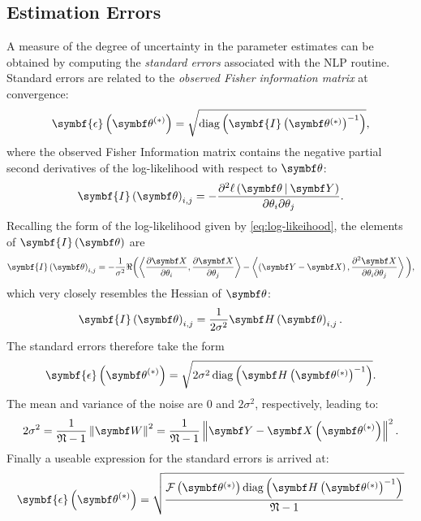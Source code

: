 \subsection{Estimation Errors}
\label{subsec:errors}
A measure of the degree of uncertainty in the parameter estimates can be obtained
by computing the \emph{standard errors} associated with the \ac{NLP} routine.
Standard errors are related  to the \emph{observed Fisher information matrix}
at convergence\cite[Section 2.7]{Pawitan2001}:
\begin{equation}
    \symbf{\epsilon}\left(\bthstar\right) = \sqrt{\diag\left(\symbf{I}\left( \bthstar \right)^{-1}\right)},
\end{equation}
where the observed Fisher Information matrix contains the negative partial second
derivatives of the log-likelihood with respect to $\bth$:
\begin{equation}
    \symbf{I}\left(\bth\right)_{i, j} =
        -\frac
        {\partial^2 \ell \left( \bdthY \right)}
        {\partial \theta_i \partial \theta_j}.
\end{equation}
Recalling the form of the log-likelihood given by \cref{eq:log-likeihood},
the elements of $\symbf{I}\left(\bth\right)$ are
\begin{equation}
    \symbf{I}\left(\bth\right)_{i, j} =
        -\frac{1}{\sigma^2}
        \Re
        \biggl(
            \left\langle
                \frac{\partial \bX}{\partial \theta_i},
                \frac{\partial \bX}{\partial \theta_j}
            \right\rangle
            -
            \left\langle
                \left(\bY - \bX\right),
                \frac{\partial^2 \bX}{\partial \theta_i \partial \theta_j}
            \right\rangle
        \biggl),
\end{equation}
which very closely resembles the Hessian of $\bth$:
\begin{equation}
    \symbf{I}\left(\bth\right)_{i,j} =
        \frac{1}{2 \sigma^2}
            \bdHth_{i,j}.
\end{equation}
The standard errors therefore take the form
\begin{equation}
    \symbf{\epsilon}\left(\bthstar\right) =
        \sqrt{
            2\sigma^2 \diag \left(
                \bdHthstar^{-1}
            \right)
        }.
\end{equation}
The mean and variance of the noise are $0$ and $2\sigma^2$, respectively,
leading to:
\begin{equation}
    2 \sigma^2 = \frac{1}{\mathfrak{N} - 1}
    \left\lVert \bW \right\rVert^2 =
    \frac{1}{\mathfrak{N} - 1} \left \lVert
        \bY - \bXthstar
    \right \rVert^2.
\end{equation}
Finally a useable expression for the standard errors is arrived at:
\begin{equation}
    \symbf{\epsilon}\left(\bthstar\right) =
        \sqrt{
            \frac
            {
                \Fthstar \diag \left(
                    \bdHthstar^{-1}
                \right)
            }
            {\mathfrak{N} - 1}
        }
\end{equation}



